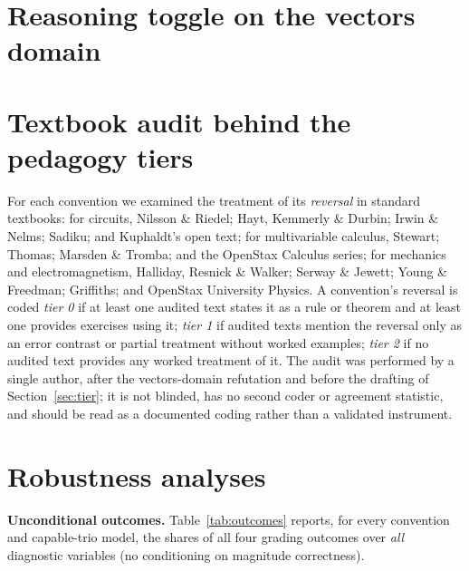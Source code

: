 \documentclass{article}
\begin{document}



\appendix

\section{Reasoning toggle on the vectors domain}\label{app:rhrladder}
\begin{table}[h]
\centering\small
\caption{Qwen3 reasoning toggle on the vectors domain (hardened tier):
competence \% and reversion \% per convention. Reasoning collapses the taught,
shallow handedness reversal but not the reaction-reporting convention.}
\label{tab:rhrladder}

\end{table}

\section{Textbook audit behind the pedagogy tiers}\label{app:audit}
For each convention we examined the treatment of its \emph{reversal} in standard
textbooks: for circuits, Nilsson \& Riedel; Hayt, Kemmerly \& Durbin; Irwin \&
Nelms; Sadiku; and Kuphaldt's open text; for multivariable calculus, Stewart;
Thomas; Marsden \& Tromba; and the OpenStax Calculus series; for mechanics and
electromagnetism, Halliday, Resnick \& Walker; Serway \& Jewett; Young \&
Freedman; Griffiths; and OpenStax University Physics. A convention's reversal is
coded \emph{tier 0} if at least one audited text states it as a rule or theorem
and at least one provides exercises using it; \emph{tier 1} if audited texts
mention the reversal only as an error contrast or partial treatment without
worked examples; \emph{tier 2} if no audited text provides any worked treatment
of it. The audit was performed by a single author, after the vectors-domain
refutation and before the drafting of Section~\ref{sec:tier}; it is not blinded,
has no second coder or agreement statistic, and should be read as a documented
coding rather than a validated instrument.

\section{Robustness analyses}\label{app:robust}
\textbf{Unconditional outcomes.} Table~\ref{tab:outcomes} reports, for every
convention and capable-trio model, the shares of all four grading outcomes over
\emph{all} diagnostic variables (no conditioning on magnitude correctness).
\begin{table}[h]\centering\scriptsize
\caption{Unconditional outcome shares over all diagnostic variables.}
\label{tab:outcomes}

\end{table}
\end{document}
